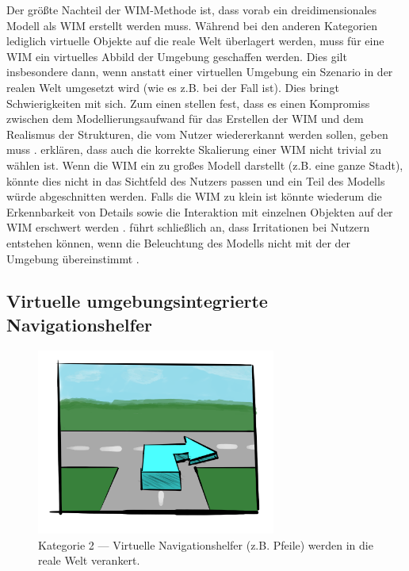 Der größte Nachteil der WIM-Methode ist, dass vorab ein dreidimensionales Modell als WIM erstellt werden muss.
Während bei den anderen Kategorien lediglich virtuelle Objekte auf die reale Welt überlagert werden, muss für eine WIM ein virtuelles Abbild der Umgebung geschaffen werden.
Dies gilt insbesondere dann, wenn anstatt einer virtuellen Umgebung ein Szenario in der realen Welt umgesetzt wird (wie es z.B. bei \textcite{Mulloni2012} der Fall ist).
Dies bringt Schwierigkeiten mit sich.
Zum einen stellen \citeauthor{Mulloni2012} fest, dass es einen Kompromiss zwischen dem Modellierungsaufwand für das Erstellen der WIM und dem Realismus der Strukturen, die vom Nutzer wiedererkannt werden sollen, geben muss \parencite[215]{Mulloni2012}.
\citeauthor{Elvezio2017} erklären, dass auch die korrekte Skalierung einer WIM nicht trivial zu wählen ist.
Wenn die WIM ein zu großes Modell darstellt (z.B. eine ganze Stadt), könnte dies nicht in das Sichtfeld des Nutzers passen und ein Teil des Modells würde abgeschnitten werden.
Falls die WIM zu klein ist könnte wiederum die Erkennbarkeit von Details sowie die Interaktion mit einzelnen Objekten auf der WIM erschwert werden \parencite[1]{Elvezio2017}.
\citeauthor{Stoakley1995} führt schließlich an, dass Irritationen bei Nutzern entstehen können, wenn die Beleuchtung des Modells nicht mit der der Umgebung übereinstimmt \parencite[269]{Stoakley1995}.

\subsection{Virtuelle umgebungsintegrierte Navigationshelfer}
\begin{figure}[h]
    \centering
    \includegraphics[width=0.7\textwidth]{figures/sketch_ar_arrows}
    \caption{Kategorie 2 --- Virtuelle Navigationshelfer (z.B. Pfeile) werden in die reale Welt verankert.}
    \label{fig:sketch_ar_arrows}
\end{figure}

